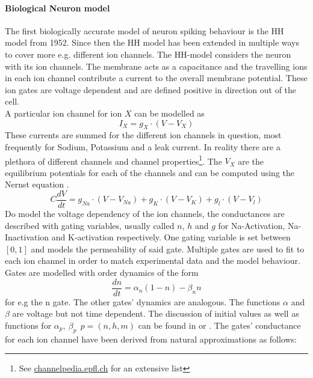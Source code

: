 	\paragraph{Biological Neuron model}
	The first biologically accurate model of neuron spiking behaviour is the \ac{HH} model from 1952\cite{hodgkin_currents_1952}. Since then the \ac{HH} model has been extended in multiple ways to cover more e.g. different ion channels. The \ac{HH}-model considers the neuron with its ion channels. The membrane acts as a capacitance and the travelling ions in each ion channel contribute a current to the overall membrane potential. These ion gates are voltage dependent and are defined positive in direction out of the cell.\\
	A particular ion channel for ion $X$ can be modelled as
	\begin{equation}
	I_X= g_X \cdot (V-V_X)
	\end{equation}
	These currents are summed for the different ion channels in question, most frequently for Sodium, Potassium and a leak current. In reality there are a plethora of different channels and channel properties\footnote{See  \url{channelpedia.epfl.ch} for an extensive list}. The $V_X$ are the equilibrium potentials for each of the channels and can be computed using the Nernst equation \cite{johnston_foundations_1995}.
	\begin{equation}
	C \frac{dV}{dt} = g_{Na} \cdot (V-V_{Na}) + g_K \cdot (V-V_K) + g_l \cdot (V-V_l)
	\end{equation}
	Do model the voltage dependency of the ion channels, the conductances are described with gating variables, usually called $n$, $h$ and $g$ for Na-Activation, Na-Inactivation and K-activation respectively. One gating variable is set between $[0,1]$ and models the permeability of said gate. Multiple gates are used to fit to each ion channel in order to match experimental data and the model behaviour.\\
	Gates are modelled with order dynamics of the form
	\begin{equation}
	\frac{dn}{dt} = \alpha_n(1-n) - \beta_n n
	\end{equation}
	for e.g the n gate. The other gates' dynamics are analogous. The functions $\alpha$ and $\beta$ are voltage but not time dependent. The discussion of initial values as well as functions for $\alpha_p,\ \beta_p\ \ p = (n,h,m)$ can be found in \cite{hodgkin_quantitative_1952} or \cite{johnston_foundations_1995}. The gates' conductance for each ion channel have been derived from natural approximations as follows:
